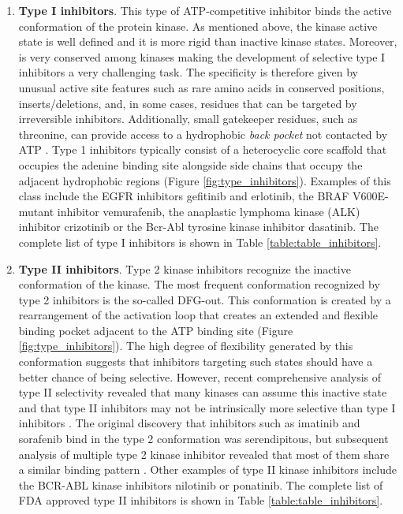 \documentclass[11pt, b5paper,twoside]{tesi_upf}
\begin{document}
 \begin{enumerate}
 
\item \textbf{Type I inhibitors}. This type of ATP-competitive inhibitor binds the active conformation of the protein kinase. As mentioned above, the kinase active state is well defined and it is more rigid than inactive kinase states. Moreover, is very conserved among kinases making the development of selective type I inhibitors a very challenging task. The specificity is therefore given by unusual active site features such as rare amino acids in conserved positions, inserts/deletions, and, in some cases, residues that can be targeted by irreversible inhibitors. Additionally,  small gatekeeper residues, such as threonine, can provide access to a hydrophobic \textit{back pocket} not contacted by ATP \cite{Noble2004}. Type 1 inhibitors typically consist of a heterocyclic core scaffold that occupies the adenine binding site alongside side chains that occupy the adjacent hydrophobic regions (Figure \ref{fig:type_inhibitors}). Examples of this class include the EGFR inhibitors gefitinib and erlotinib, the BRAF V600E-mutant inhibitor vemurafenib, the anaplastic lymphoma kinase (ALK) inhibitor crizotinib or the Bcr-Abl tyrosine kinase inhibitor dasatinib. The complete list of type I inhibitors is shown in Table \ref{table:table_inhibitors}. 

\item \textbf{Type II inhibitors}. Type 2 kinase inhibitors recognize the inactive conformation of the kinase. The most frequent conformation recognized by type 2 inhibitors is the so-called DFG-out. This conformation is created by a rearrangement of the activation loop that creates an extended and flexible binding pocket adjacent to the ATP binding site (Figure \ref{fig:type_inhibitors}). The high degree of flexibility generated by this conformation suggests that inhibitors targeting such states should have a better chance of being selective. However, recent comprehensive analysis of type II selectivity revealed that many kinases can assume this inactive state and that type II inhibitors may not be intrinsically more selective than type I inhibitors \cite{Inhibitor2016}. The original discovery that inhibitors such as imatinib and sorafenib bind in the type 2 conformation was serendipitous, but subsequent analysis of multiple type 2 kinase inhibitor revealed that most of them share a similar binding pattern \cite{Inhibitor2016}. Other examples of type II kinase inhibitors include the BCR-ABL kinase inhibitors nilotinib or ponatinib. The complete list of FDA approved type II inhibitors is shown in Table \ref{table:table_inhibitors}. 


\end{enumerate}
\end{document}
